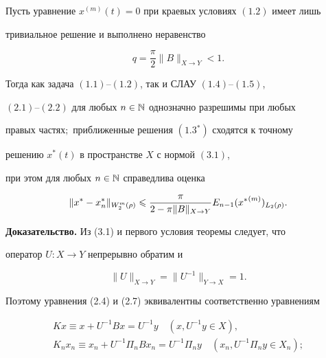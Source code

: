 \begin{thm}


Пусть уравнение $x^{(m)}(t)=0$ при краевых условиях $(1.2)$ имеет лишь 


тривиальное решение и выполнено неравенство


\begin{equation}


q = \frac{\pi}{2}\|B\|_{X\to Y} <1.


\end{equation}


Тогда как задача $(1.1)$--$(1.2)$, так и СЛАУ $(1.4)$--$(1.5)$,


$(2.1)$--$(2.2)$ для любых $n\in \Bbb{N}$ однозначно разрешимы при любых 


правых частях$;$ приближенные решения $(1.3{}^*)$ сходятся к точному


решению $x^*(t)$ в пространстве $X$ с нормой $(3.1)$,


при этом для любых $n\in\Bbb{N}$ справедлива оценка


\begin{equation}


\|x^* - x^*_n\|_{W^m_2(\rho)} \lea


\frac{\pi}{2-\pi\|B\|_{X\to Y}}E_{n-1}({x^*}^{(m)})_{L_2(\rho)}.


\end{equation}


\end{thm}





{\bf Доказательство. } Из (3.1) и первого условия теоремы следует, что 


оператор $U:X\to Y$ непрерывно обратим и


\begin{equation}


\|U\|_{X\to Y} = \|U^{-1}\|_{Y\to X} = 1.


\end{equation}


Поэтому уравнения (2.4) и (2.7) эквивалентны соответственно уравнениям


\begin{gather}


Kx \equiv x + U^{-1}Bx = U^{-1} y \quad (x,U^{-1}y\in X), \\


%


K_n x_n \equiv x_n + U^{-1}\Pi_n B x_n = U^{-1} \Pi_n y


\quad (x_n,U^{-1}\Pi_n y\in X_n);


\end{gather}


